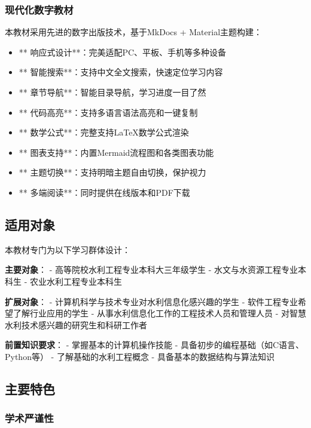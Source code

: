 \subsubsection{现代化数字教材}\label{ux73b0ux4ee3ux5316ux6570ux5b57ux6559ux6750}

本教材采用先进的数字出版技术，基于MkDocs + Material主题构建：

\begin{itemize}
\tightlist
\item
  ** 响应式设计**：完美适配PC、平板、手机等多种设备
\item
  ** 智能搜索**：支持中文全文搜索，快速定位学习内容
\item
  ** 章节导航**：智能目录导航，学习进度一目了然\\
\item
  ** 代码高亮**：支持多语言语法高亮和一键复制
\item
  ** 数学公式**：完整支持LaTeX数学公式渲染
\item
  ** 图表支持**：内置Mermaid流程图和各类图表功能
\item
  ** 主题切换**：支持明暗主题自由切换，保护视力
\item
  ** 多端阅读**：同时提供在线版本和PDF下载
\end{itemize}

\subsection{适用对象}\label{ux9002ux7528ux5bf9ux8c61}

本教材专门为以下学习群体设计：

\textbf{主要对象}： - 高等院校水利工程专业本科大三年级学生 - 水文与水资源工程专业本科生 - 农业水利工程专业本科生

\textbf{扩展对象}： - 计算机科学与技术专业对水利信息化感兴趣的学生 - 软件工程专业希望了解行业应用的学生 - 从事水利信息化工作的工程技术人员和管理人员 - 对智慧水利技术感兴趣的研究生和科研工作者

\textbf{前置知识要求}： - 掌握基本的计算机操作技能 - 具备初步的编程基础（如C语言、Python等） - 了解基础的水利工程概念 - 具备基本的数据结构与算法知识

\subsection{主要特色}\label{ux4e3bux8981ux7279ux8272}

\subsubsection{学术严谨性}\label{ux5b66ux672fux4e25ux8c28ux6027}

